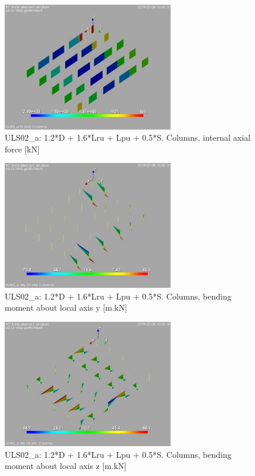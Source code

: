 \begin{figure}
\begin{center}
\includegraphics[width=75mm]{annex_res_columns/graphics/resSimplLC/ULS02_acolumnsN}
\caption{ULS02\_a: 1.2*D + 1.6*Lru + Lpu + 0.5*S. Columns, internal axial force [kN]}
\end{center}
\end{figure}
\begin{figure}
\begin{center}
\includegraphics[width=75mm]{annex_res_columns/graphics/resSimplLC/ULS02_acolumnsMy}
\caption{ULS02\_a: 1.2*D + 1.6*Lru + Lpu + 0.5*S. Columns, bending moment about local axis y [m.kN]}
\end{center}
\end{figure}
\begin{figure}
\begin{center}
\includegraphics[width=75mm]{annex_res_columns/graphics/resSimplLC/ULS02_acolumnsMz}
\caption{ULS02\_a: 1.2*D + 1.6*Lru + Lpu + 0.5*S. Columns, bending moment about local axis z [m.kN]}
\end{center}
\end{figure}
